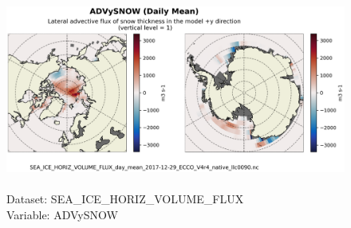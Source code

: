 \begin{figure}[H]
\centering
\includegraphics[scale=0.5]{../images/plots/native_plots/Sea-Ice_and_Snow_Horizontal_Volume_Fluxes/ADVySNOW.png}
\caption{\\Dataset: SEA\_ICE\_HORIZ\_VOLUME\_FLUX\\Variable: ADVySNOW}
\label{tab:table-SEA_ICE_HORIZ_VOLUME_FLUX_ADVySNOW-Plot}
\end{figure}
\pagebreak
